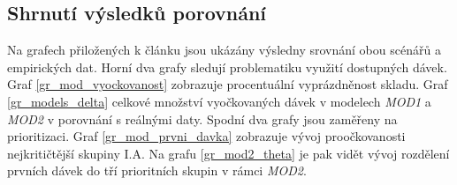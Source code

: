 %


\subsection*{Shrnutí výsledků porovnání}


Na grafech přiložených k článku jsou ukázány výsledny srovnání obou scénářů a empirických dat. Horní dva grafy sledují problematiku využití dostupných dávek. Graf \ref{gr_mod_vyockovanost} zobrazuje procentuální vyprázdněnost skladu. Graf \ref{gr_models_delta} celkové množství vyočkovaných dávek v modelech \emph{MOD1} a \emph{MOD2} v porovnání s reálnými daty.
%
Spodní dva grafy jsou zaměřeny na prioritizaci.
Graf \ref{gr_mod_prvni_davka} zobrazuje vývoj proočkovanosti nejkritičtější skupiny I.A. Na grafu  \ref{gr_mod2_theta} je pak vidět vývoj rozdělení prvních dávek do tří prioritních skupin v rámci \emph{MOD2}.


